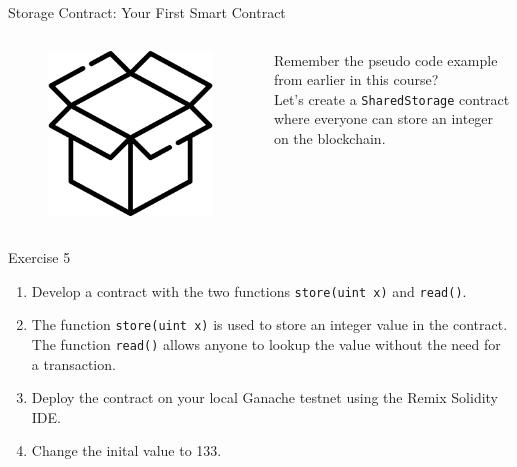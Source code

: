 \documentclass[]{beamer}
\begin{document}
\begin{frame}{Storage Contract: Your First Smart Contract}
	
	\begin{columns}
		\begin{column}{0.15\textwidth}
			\begin{figure}
				\includegraphics[width = \textwidth]{../assets/images/box.png}
			\end{figure}
		\end{column}
		\begin{column}{0.85\textwidth}
			Remember the pseudo code example from earlier in this course?\\
			Let's create a \texttt{SharedStorage} contract where everyone can store an integer on the blockchain.
		\end{column}
	\end{columns}
	\vspace{1.5em}
	\begin{exercise}{Exercise 5}
		\begin{enumerate}
			\item Develop a contract with the two functions \texttt{\textcolor{focus}{store}(uint x)} and \texttt{\textcolor{focus}{read}()}.
			\item The function \texttt{\textcolor{focus}{store}(uint x)} is used to store an integer value in the contract. The function \texttt{\textcolor{focus}{read}()} allows anyone to lookup the value without the need for a transaction.
			\item Deploy the contract on your local Ganache testnet using the Remix Solidity IDE.
			\item Change the inital value to 133.
		\end{enumerate}
	\end{exercise}
\end{frame}
\end{document}
